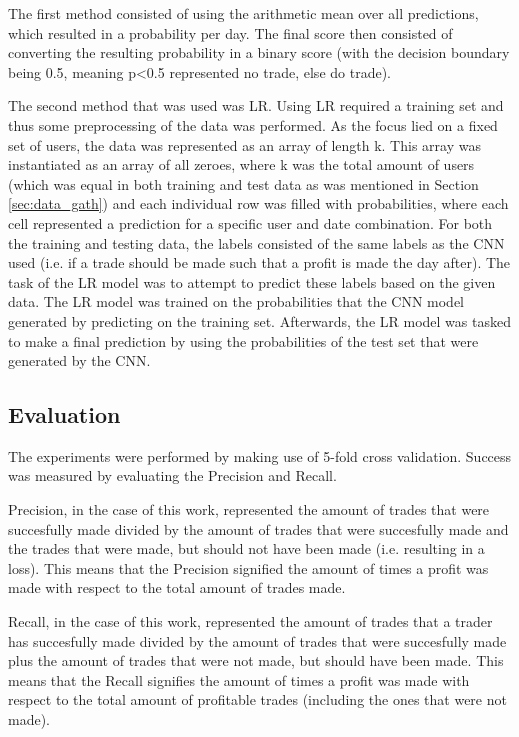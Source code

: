 \documentclass[sigconf]{acmart-txmm}
\begin{document}
The first method consisted of using the arithmetic mean over all predictions, which resulted in a probability per day. The final score then consisted of converting the resulting probability in a binary score (with the decision boundary being 0.5, meaning p<0.5 represented no trade, else do trade).

The second method that was used was LR. Using LR required a training set and thus some preprocessing of the data was performed. As the focus lied on a fixed set of users, the data was represented as an array of length k. This array was instantiated as an array of all zeroes, where k was the total amount of users (which was equal in both training and test data as was mentioned in Section \ref{sec:data_gath}) and each individual row was filled with probabilities, where each cell represented a prediction for a specific user and date combination. For both the training and testing data, the labels consisted of the same labels as the CNN used (i.e. if a trade should be made such that a profit is made the day after). The task of the LR model was to attempt to predict these labels based on the given data. The LR model was trained on the probabilities that the CNN model generated by predicting on the training set. Afterwards, the LR model was tasked to make a final prediction by using the probabilities of the test set that were generated by the CNN.

\subsection{Evaluation}
\label{sec:eval}
The experiments were performed by making use of 5-fold cross validation. Success was measured by evaluating the Precision and Recall. 

Precision, in the case of this work, represented the amount of trades that were succesfully made divided by the amount of trades that were succesfully made and the trades that were made, but should not have been made (i.e. resulting in a loss). This means that the Precision signified the amount of times a profit was made with respect to the total amount of trades made.

Recall, in the case of this work, represented the amount of trades that a trader has succesfully made divided by the amount of trades that were succesfully made plus the amount of trades that were not made, but should have been made. This means that the Recall signifies the amount of times a profit was made with respect to the total amount of profitable trades (including the ones that were not made).
\end{document}
